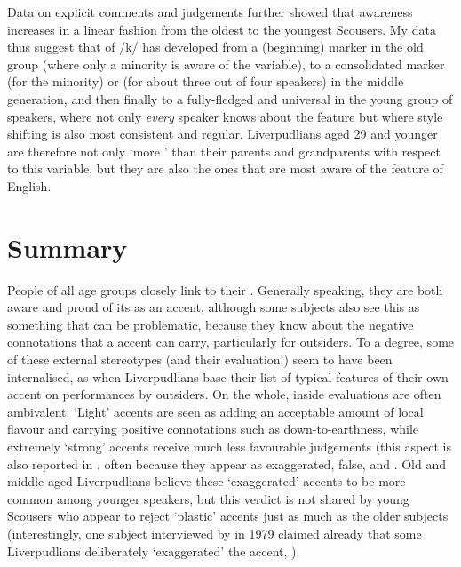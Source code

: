 Data on explicit comments and judgements further showed that  awareness increases in a linear fashion from the oldest to the youngest Scousers.
My data thus suggest that  of /k/ has developed from a (beginning) marker in the old group (where only a minority is  aware of the variable), to a consolidated marker (for the minority) or  (for about three out of four speakers) in the middle generation, and then finally to a fully-fledged and universal  in the young group of speakers, where not only \emph{every} speaker knows about the feature but where style shifting is also most consistent and regular.
Liverpudlians aged 29 and younger are therefore not only `more ' than their parents and grandparents with respect to this variable, but they are also the ones that are most aware of the feature of  English.

\section{Summary}
\label{prod.disc.summary}

People of all age groups closely link  to their .
Generally speaking, they are both aware and proud of its  as an accent, although some subjects also see this as something that can be problematic, because they know about the negative connotations that a  accent can carry, particularly for outsiders.
To a degree, some of these external stereotypes (and their evaluation!) seem to have been internalised, as when Liverpudlians base their list of typical features of their own accent on  performances by outsiders.
On the whole, inside evaluations are often ambivalent: `Light' accents are seen as adding an acceptable amount of local flavour and carrying positive connotations such as down-to-earthness, while extremely `strong'  accents receive much less favourable judgements (this aspect is also reported in \citealt[33]{delyon1981}, often because they appear as exaggerated, false, and .
Old and middle-aged Liverpudlians believe these `exaggerated' accents to be more common among younger speakers, but this verdict is not shared by young Scousers who appear to reject `plastic' accents just as much as the older subjects (interestingly, one subject interviewed by \citeauthor{delyon1981} in 1979 claimed already that some Liverpudlians deliberately `exaggerated' the accent, \citealt[cf.][30]{delyon1981}).

